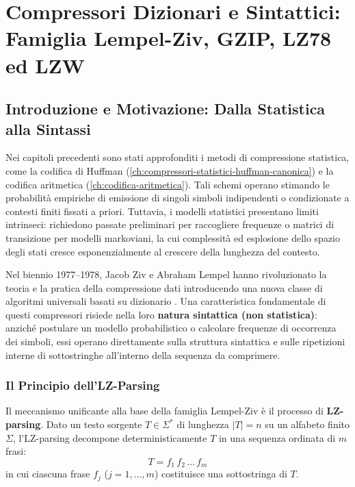\chapter{Compressori Dizionari e Sintattici: Famiglia Lempel-Ziv, GZIP, LZ78 ed LZW}
\label{ch:compressori-lempel-ziv}

\section{Introduzione e Motivazione: Dalla Statistica alla Sintassi}
\label{sec:intro-lz-sintassi}

Nei capitoli precedenti sono stati approfonditi i metodi di compressione statistica, come la codifica di Huffman (\autoref{ch:compressori-statistici-huffman-canonica}) e la codifica aritmetica (\autoref{ch:codifica-aritmetica}). Tali schemi operano stimando le probabilit\`a empiriche di emissione di singoli simboli indipendenti o condizionate a contesti finiti fissati a priori. Tuttavia, i modelli statistici presentano limiti intrinseci: richiedono passate preliminari per raccogliere frequenze o matrici di transizione per modelli markoviani, la cui complessit\`a ed esplosione dello spazio degli stati cresce esponenzialmente al crescere della lunghezza del contesto.

Nel biennio 1977--1978, Jacob Ziv e Abraham Lempel hanno rivoluzionato la teoria e la pratica della compressione dati introducendo una nuova classe di algoritmi universali basati su dizionario \cite{ziv1977, ziv1978}. Una caratteristica fondamentale di questi compressori risiede nella loro \textbf{natura sintattica (non statistica)}: anzich\'e postulare un modello probabilistico o calcolare frequenze di occorrenza dei simboli, essi operano direttamente sulla struttura sintattica e sulle ripetizioni interne di sottostringhe all'interno della sequenza da comprimere.

\FloatBarrier
\subsection{Il Principio dell'LZ-Parsing}
\label{subsec:lz-parsing-fondamenti}

Il meccanismo unificante alla base della famiglia Lempel-Ziv \`e il processo di \textbf{LZ-parsing}. Dato un testo sorgente $T \in \Sigma^*$ di lunghezza $\vert T \vert = n$ su un alfabeto finito $\Sigma$, l'LZ-parsing decompone deterministicamente $T$ in una sequenza ordinata di $m$ frasi:
\begin{equation}
  T = f_1 \, f_2 \, \dots \, f_m
\end{equation}
in cui ciascuna frase $f_j$ ($j = 1, \dots, m$) costituisce una sottostringa di $T$. 

